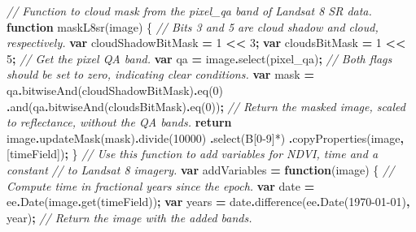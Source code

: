 \documentclass[
]{article}
\newenvironment{Shaded}{\begin{snugshade}}{\end{snugshade}}
\newcommand{\CommentTok}[1]{\textcolor[rgb]{0.56,0.35,0.01}{\textit{#1}}}
\newcommand{\ControlFlowTok}[1]{\textcolor[rgb]{0.13,0.29,0.53}{\textbf{#1}}}
\newcommand{\DecValTok}[1]{\textcolor[rgb]{0.00,0.00,0.81}{#1}}
\newcommand{\FunctionTok}[1]{\textcolor[rgb]{0.00,0.00,0.00}{#1}}
\newcommand{\KeywordTok}[1]{\textcolor[rgb]{0.13,0.29,0.53}{\textbf{#1}}}
\newcommand{\NormalTok}[1]{#1}
\newcommand{\OperatorTok}[1]{\textcolor[rgb]{0.81,0.36,0.00}{\textbf{#1}}}
\newcommand{\StringTok}[1]{\textcolor[rgb]{0.31,0.60,0.02}{#1}}
\begin{document}
\begin{Shaded}
\begin{Highlighting}[]
\CommentTok{// Function to cloud mask from the pixel\_qa band of Landsat 8 SR data.}
\KeywordTok{function} \FunctionTok{maskL8sr}\NormalTok{(image) \{}
  \CommentTok{// Bits 3 and 5 are cloud shadow and cloud, respectively.}
  \KeywordTok{var}\NormalTok{ cloudShadowBitMask }\OperatorTok{=} \DecValTok{1} \OperatorTok{\textless{}\textless{}} \DecValTok{3}\OperatorTok{;}
  \KeywordTok{var}\NormalTok{ cloudsBitMask }\OperatorTok{=} \DecValTok{1} \OperatorTok{\textless{}\textless{}} \DecValTok{5}\OperatorTok{;}
  \CommentTok{// Get the pixel QA band.}
  \KeywordTok{var}\NormalTok{ qa }\OperatorTok{=}\NormalTok{ image}\OperatorTok{.}\FunctionTok{select}\NormalTok{(}\StringTok{\textquotesingle{}pixel\_qa\textquotesingle{}}\NormalTok{)}\OperatorTok{;}
  \CommentTok{// Both flags should be set to zero, indicating clear conditions.}
  \KeywordTok{var}\NormalTok{ mask }\OperatorTok{=}\NormalTok{ qa}\OperatorTok{.}\FunctionTok{bitwiseAnd}\NormalTok{(cloudShadowBitMask)}\OperatorTok{.}\FunctionTok{eq}\NormalTok{(}\DecValTok{0}\NormalTok{)}
  \OperatorTok{.}\FunctionTok{and}\NormalTok{(qa}\OperatorTok{.}\FunctionTok{bitwiseAnd}\NormalTok{(cloudsBitMask)}\OperatorTok{.}\FunctionTok{eq}\NormalTok{(}\DecValTok{0}\NormalTok{))}\OperatorTok{;}
  \CommentTok{// Return the masked image, scaled to reflectance, without the QA bands.}
  \ControlFlowTok{return}\NormalTok{ image}\OperatorTok{.}\FunctionTok{updateMask}\NormalTok{(mask)}\OperatorTok{.}\FunctionTok{divide}\NormalTok{(}\DecValTok{10000}\NormalTok{)}
  \OperatorTok{.}\FunctionTok{select}\NormalTok{(}\StringTok{\textquotesingle{}B[0{-}9]*\textquotesingle{}}\NormalTok{)}
  \OperatorTok{.}\FunctionTok{copyProperties}\NormalTok{(image}\OperatorTok{,}\NormalTok{ [timeField])}\OperatorTok{;}
\NormalTok{\}}
\CommentTok{// Use this function to add variables for NDVI, time and a constant}
\CommentTok{// to Landsat 8 imagery.}
\KeywordTok{var}\NormalTok{ addVariables }\OperatorTok{=} \KeywordTok{function}\NormalTok{(image) \{}
  \CommentTok{// Compute time in fractional years since the epoch.}
  \KeywordTok{var}\NormalTok{ date }\OperatorTok{=}\NormalTok{ ee}\OperatorTok{.}\FunctionTok{Date}\NormalTok{(image}\OperatorTok{.}\FunctionTok{get}\NormalTok{(timeField))}\OperatorTok{;}
  \KeywordTok{var}\NormalTok{ years }\OperatorTok{=}\NormalTok{ date}\OperatorTok{.}\FunctionTok{difference}\NormalTok{(ee}\OperatorTok{.}\FunctionTok{Date}\NormalTok{(}\StringTok{\textquotesingle{}1970{-}01{-}01\textquotesingle{}}\NormalTok{)}\OperatorTok{,} \StringTok{\textquotesingle{}year\textquotesingle{}}\NormalTok{)}\OperatorTok{;}
  \CommentTok{// Return the image with the added bands.}

\end{Highlighting}
\end{Shaded}
\end{document}
